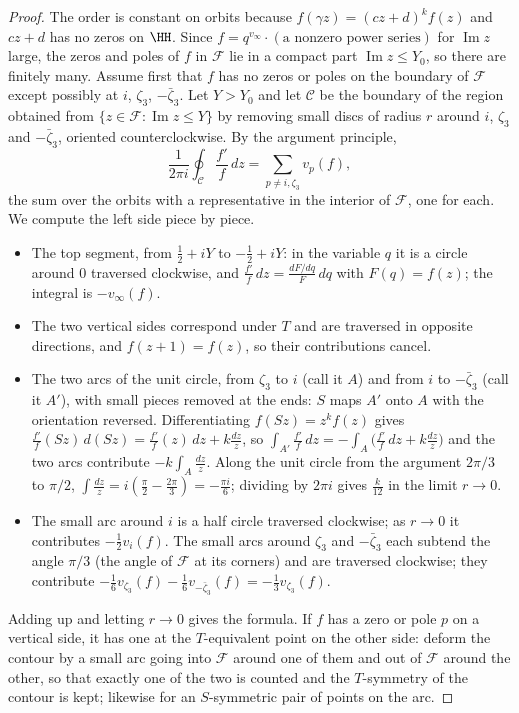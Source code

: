 \begin{proof}
The order is constant on orbits because $f(\gamma z)=(cz+d)^kf(z)$ and $cz+d$ has no zeros on $\HH$. Since $f=q^{v_\infty}\cdot(\text{a nonzero power series})$ for $\operatorname{Im}z$ large, the zeros and
poles of $f$ in $\mathcal F$ lie in a compact part $\operatorname{Im}z\le Y_0$, so there are finitely many. Assume first that $f$ has no zeros or poles on the boundary of $\mathcal F$
except possibly at $i$, $\zeta_3$, $-\bar\zeta_3$. Let $Y>Y_0$ and let $\mathcal C$ be the boundary of the region obtained from $\{z\in\mathcal F:\operatorname{Im}z\le Y\}$ by removing small discs
of radius $r$ around $i$, $\zeta_3$ and $-\bar\zeta_3$, oriented counterclockwise. By the argument principle,
\[
\frac1{2\pi i}\oint_{\mathcal C}\frac{f'}f\,dz=\sum_{p\ne i,\zeta_3}v_p(f),
\]
the sum over the orbits with a representative in the interior of $\mathcal F$, one for each. We compute the left side piece by piece.
\begin{itemize}
\item The top segment, from $\frac12+iY$ to $-\frac12+iY$: in the variable $q$ it is a circle around $0$ traversed clockwise, and $\frac{f'}f\,dz=\frac{dF/dq}F\,dq$ with $F(q)=f(z)$; the
integral is $-v_\infty(f)$.
\item The two vertical sides correspond under $T$ and are traversed in opposite directions, and $f(z+1)=f(z)$, so their contributions cancel.
\item The two arcs of the unit circle, from $\zeta_3$ to $i$ (call it $A$) and from $i$ to $-\bar\zeta_3$ (call it $A'$), with small pieces removed at the ends: $S$ maps $A'$ onto $A$
with the orientation reversed. Differentiating $f(Sz)=z^kf(z)$ gives $\frac{f'}f(Sz)\,d(Sz)=\frac{f'}f(z)\,dz+k\frac{dz}z$, so
$\int_{A'}\frac{f'}f\,dz=-\int_A\bigl(\frac{f'}f\,dz+k\frac{dz}z\bigr)$ and the two arcs contribute $-k\int_A\frac{dz}z$. Along the unit circle from the argument $2\pi/3$ to $\pi/2$,
$\int\frac{dz}z=i(\frac\pi2-\frac{2\pi}3)=-\frac{\pi i}6$; dividing by $2\pi i$ gives $\frac k{12}$ in the limit $r\to0$.
\item The small arc around $i$ is a half circle traversed clockwise; as $r\to0$ it contributes $-\frac12v_i(f)$. The small arcs around $\zeta_3$ and $-\bar\zeta_3$ each subtend the angle
$\pi/3$ (the angle of $\mathcal F$ at its corners) and are traversed clockwise; they contribute $-\frac16v_{\zeta_3}(f)-\frac16v_{-\bar\zeta_3}(f)=-\frac13v_{\zeta_3}(f)$.
\end{itemize}
Adding up and letting $r\to0$ gives the formula. If $f$ has a zero or pole $p$ on a vertical side, it has one at the $T$-equivalent point on the other side: deform the
contour by a small arc going into $\mathcal F$ around one of them and out of $\mathcal F$ around the other, so that exactly one of the two is counted and the $T$-symmetry of the
contour is kept; likewise for an $S$-symmetric pair of points on the arc.
\end{proof}

